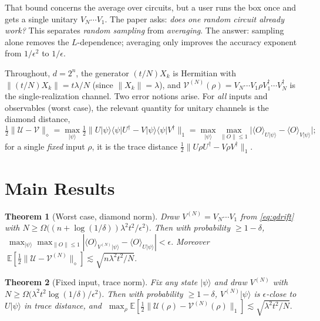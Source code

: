 ﻿\documentclass[12pt]{article}
\theoremstyle{plain}
\newtheorem{theorem}{Theorem}
\theoremstyle{definition}
\newcommand{\norm}[1]{\lVert #1 \rVert}
\newcommand{\dnorm}[1]{\lVert #1 \rVert_{\diamond}}
\newcommand{\tnorm}[1]{\lVert #1 \rVert_{1}}
\newcommand{\E}{\mathbb{E}}
\newcommand{\ket}[1]{\lvert #1 \rangle}
\newcommand{\ketbra}[1]{\lvert #1 \rangle\!\langle #1 \rvert}
\newcommand{\Uchan}{\mathcal{U}}
\newcommand{\Vchan}{\mathcal{V}}
\newcommand{\half}{\tfrac{1}{2}}
\begin{document}
	That bound concerns the average over circuits, but a user runs the box once and gets a single
	unitary $V_N\cdots V_1$. The paper asks: \emph{does one random circuit already work?} This
	separates \emph{random sampling} from \emph{averaging}. The answer: sampling alone removes
	the $L$-dependence; averaging only improves the accuracy exponent from $1/\epsilon^2$ to
	$1/\epsilon$.
	
	Throughout, $d=2^n$, the generator $(t/N)X_k$ is Hermitian with $\norm{(t/N)X_k}=t\lambda/N$
	(since $\norm{X_k}=\lambda$), and $\Vchan^{(N)}(\rho)=V_N\cdots V_1\rho V_1^\dagger\cdots V_N^\dagger$
	is the single-realization channel. Two error notions arise. For \emph{all} inputs and
	observables (worst case), the relevant quantity for unitary channels is the diamond distance,
	\begin{equation}
		\half\dnorm{\Uchan-\Vchan}
		=\max_{\ket\psi}\half\tnorm{U\ketbra\psi U^\dagger-V\ketbra\psi V^\dagger}
		=\max_{\ket\psi}\max_{\norm{O}\le1}\big|\langle O\rangle_{U\ket\psi}-\langle O\rangle_{V\ket\psi}\big|;
		\label{eq:diamond}
	\end{equation}
	for a single \emph{fixed} input $\rho$, it is the trace distance
	$\half\tnorm{U\rho U^\dagger-V\rho V^\dagger}$.
	
	
	\section{Main Results}
	
	\begin{theorem}[Worst case, diamond norm]\label{thm:diamond}
		Draw $V^{(N)}=V_N\cdots V_1$ from \eqref{eq:qdrift} with
		$N\ge\Omega\big((n+\log(1/\delta))\lambda^2t^2/\epsilon^2\big)$. Then with probability
		$\ge1-\delta$, $\;\max_{\ket\psi}\max_{\norm{O}\le1}|\langle O\rangle_{V^{(N)}\ket\psi}-\langle O\rangle_{U\ket\psi}|<\epsilon.$
		Moreover $\;\E[\half\dnorm{\Uchan-\Vchan^{(N)}}]\lesssim\sqrt{n\lambda^2t^2/N}.$
	\end{theorem}
	
	\begin{theorem}[Fixed input, trace norm]\label{thm:fixed}
		Fix any state $\ket\psi$ and draw $V^{(N)}$ with $N\ge\Omega\big(\lambda^2t^2\log(1/\delta)/\epsilon^2\big)$.
		Then with probability $\ge1-\delta$, $V^{(N)}\ket\psi$ is $\epsilon$-close to $U\ket\psi$ in
		trace distance, and $\;\max_\rho\E[\half\tnorm{\Uchan(\rho)-\Vchan^{(N)}(\rho)}]\lesssim\sqrt{\lambda^2t^2/N}.$
	\end{theorem}
	
\end{document}
